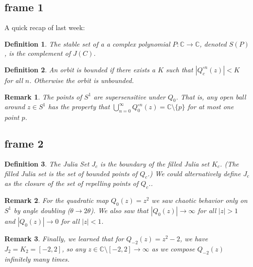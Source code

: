 \documentclass[xcolor=x11names,compress]{beamer}
\renewcommand{\(}{\begin{columns}}
\renewcommand{\)}{\end{columns}}
\newcommand{\<}[1]{\begin{column}{#1}}
\renewcommand{\>}{\end{column}}
\newtheorem{defn}{Definition}
\newtheorem{rmk}{Remark}
\begin{document}
\subsection{frame 1}
\begin{frame}


A quick recap of last week:

\pause

\begin{defn}
The \textsl{stable set} of a a complex polynomial $P: \mathbb{C} \rightarrow \mathbb{C}$, denoted $S(P)$, is the complement of $J(C)$.
\end{defn}

\pause

\begin{defn}
An orbit is \textsl{bounded} if there exists a $K$ such that $|Q_c^{\circ n}(z)| < K$ for all $n$. Otherwise the orbit is \textsl{unbounded}.
\end{defn}

\pause

\begin{rmk}
The points of $S^1$ are \textsl{supersensitive} under $Q_{0}$. That is, any open ball around $z \in S^1$ has the property that $\bigcup_{n=0}^\infty Q_0^{\circ n} (z) = \mathbb{C} \setminus \{p\}$ for at most one point $p$.
\end{rmk}

\end{frame}

\subsection{frame 2}
\begin{frame}

\begin{defn}
The Julia Set $J_c$ is the boundary of the filled Julia set $K_c$. (The filled Julia set is the set of bounded points of $Q_c$.) We could alternatively define $J_c$ as the closure of the set of repelling points of $Q_c$..
\end{defn}

\pause


\begin{rmk}
For the quadratic map $Q_0(z) = z^2$ we saw chaotic behavior only on $S^1$ by angle doubling ($\theta \rightarrow 2\theta$). We also saw that $|Q_0(z)| \rightarrow \infty$ for all $|z| > 1$ and $|Q_0(z)| \rightarrow 0$ for all $|z| < 1$.
\end{rmk}

\pause


\begin{rmk}
Finally, we learned that for $Q_{-2}(z) = z^2 - 2$, we have $J_2 = K_2 = [-2, 2]$, so any $z \in \mathbb{C} \setminus [-2,2] \rightarrow \infty$ as we compose $Q_{-2}(z)$ infinitely many times. 
\end{rmk}

\end{frame}
\end{document}
